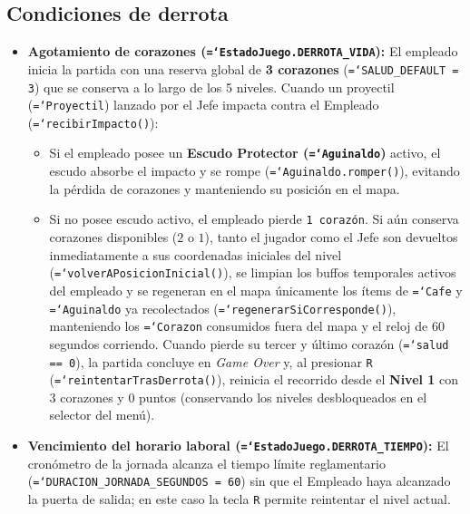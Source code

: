 \documentclass[12pt, a4paper]{article}
\DeclareRobustCommand{\code}[1]{\textcolor{codegreen}{\texttt{\hyphenchar\font=`\-#1}}}
\begin{document}
\subsection{Condiciones de derrota}
\begin{itemize}[leftmargin=1.27cm]
    \item \textbf{Agotamiento de corazones (\code{EstadoJuego.DERROTA\_VIDA}):} El empleado inicia la partida con una reserva global de \textbf{3 corazones} (\code{SALUD\_DEFAULT = 3}) que se conserva a lo largo de los 5 niveles. Cuando un proyectil (\code{Proyectil}) lanzado por el Jefe impacta contra el Empleado (\code{recibirImpacto()}):
    \begin{itemize}[leftmargin=1.0cm]
        \item Si el empleado posee un \textbf{Escudo Protector (\code{Aguinaldo})} activo, el escudo absorbe el impacto y se rompe (\code{Aguinaldo.romper()}), evitando la pérdida de corazones y manteniendo su posición en el mapa.
        \item Si no posee escudo activo, el empleado pierde \texttt{1 corazón}. Si aún conserva corazones disponibles ($2$ o $1$), tanto el jugador como el Jefe son devueltos inmediatamente a sus coordenadas iniciales del nivel (\code{volverAPosicionInicial()}), se limpian los buffos temporales activos del empleado y se regeneran en el mapa únicamente los ítems de \code{Cafe} y \code{Aguinaldo} ya recolectados (\code{regenerarSiCorresponde()}), manteniendo los \code{Corazon} consumidos fuera del mapa y el reloj de 60 segundos corriendo. Cuando pierde su tercer y último corazón (\code{salud == 0}), la partida concluye en \textit{Game Over} y, al presionar \texttt{R} (\code{reintentarTrasDerrota()}), reinicia el recorrido desde el \textbf{Nivel 1} con 3 corazones y 0 puntos (conservando los niveles desbloqueados en el selector del menú).
    \end{itemize}
    \item \textbf{Vencimiento del horario laboral (\code{EstadoJuego.DERROTA\_TIEMPO}):} El cronómetro de la jornada alcanza el tiempo límite reglamentario (\code{DURACION\_JORNADA\_SEGUNDOS = 60}) sin que el Empleado haya alcanzado la puerta de salida; en este caso la tecla \texttt{R} permite reintentar el nivel actual.
\end{itemize}

\end{document}
